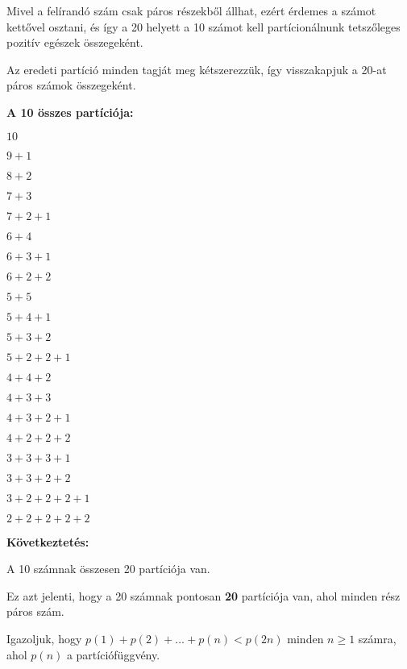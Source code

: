 \begin{solution}
Mivel a felírandó szám csak páros részekből állhat, ezért érdemes
a számot kettővel osztani, és így a 20 helyett a 10 számot kell partícionálnunk
tetszőleges pozitív egészek összegeként.

Az eredeti partíció minden tagját meg kétszerezzük, így visszakapjuk
a 20-at páros számok összegeként.

\bigskip{}

\textbf{A 10 összes partíciója:}

$10$

$9+1$

$8+2$

$7+3$

$7+2+1$

$6+4$

$6+3+1$

$6+2+2$

$5+5$

$5+4+1$

$5+3+2$

$5+2+2+1$

$4+4+2$

$4+3+3$

$4+3+2+1$

$4+2+2+2$

$3+3+3+1$

$3+3+2+2$

$3+2+2+2+1$

$2+2+2+2+2$

\bigskip{}

\textbf{Következtetés:}

A 10 számnak összesen 20 partíciója van.

Ez azt jelenti, hogy a 20 számnak pontosan \textbf{20} partíciója
van, ahol minden rész páros szám.
\end{solution}
\begin{extraproblem}
Igazoljuk, hogy $p(1)+p(2)+\dots+p(n)<p(2n)$ minden $n\geq1$ számra,
ahol $p(n)$ a partíciófüggvény. 
\end{extraproblem}
